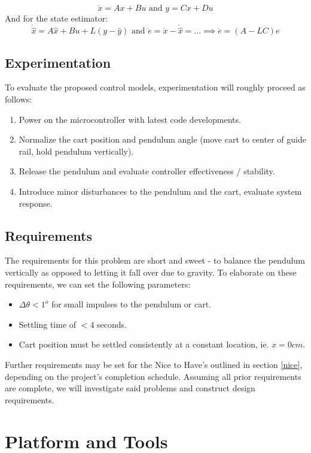 \documentclass[12pt]{article}
\begin{document}
\begin{equation}
    \dot{x} = Ax + Bu \textrm{ and }
    y = Cx + Du
\end{equation}
And for the state estimator:
\begin{equation}
    \dot{\hat{x}} = A\hat{x} + Bu + L(y-\hat{y}) \textrm{ and }
    \dot{e} = \dot{x} - \dot{\hat{x}} = ... \implies \dot{e} = (A - LC)e
\end{equation}

\subsection{Experimentation}
To evaluate the proposed control models, experimentation will roughly proceed as follows:
\begin{enumerate}
    \item Power on the microcontroller with latest code developments.
    \item Normalize the cart position and pendulum angle (move cart to center of guide rail, hold pendulum vertically).
    \item Release the pendulum and evaluate controller effectiveness / stability.
    \item Introduce minor disturbances to the pendulum and the cart, evaluate system response.
\end{enumerate}
    
\subsection{Requirements}
The requirements for this problem are short and sweet - to balance the pendulum vertically as opposed to letting it fall over due to gravity. To elaborate on these requirements, we can set the following parameters:
\begin{itemize}
    \item $\Delta \theta < 1^o$ for small impulses to the pendulum or cart.
    \item Settling time of $< 4$ seconds.
    \item Cart position must be settled consistently at a constant location, ie. $x=0cm$.
\end{itemize}
Further requirements may be set for the Nice to Have's outlined in section \ref{nice}, depending on the project's completion schedule. Assuming all prior requirements are complete, we will investigate said problems and construct design requirements. 
\section{Platform and Tools}
\end{document}
